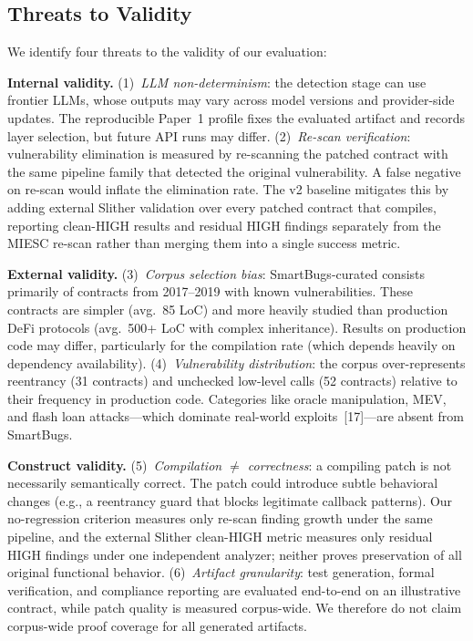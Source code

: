 \documentclass[conference]{IEEEtran}
\begin{document}
\subsection{Threats to Validity}
\label{sec:threats}

We identify four threats to the validity of our evaluation:

\textbf{Internal validity.} (1)~\emph{LLM non-determinism}: the detection stage can use frontier LLMs, whose outputs may vary across model versions and provider-side updates. The reproducible Paper~1 profile fixes the evaluated artifact and records layer selection, but future API runs may differ. (2)~\emph{Re-scan verification}: vulnerability elimination is measured by re-scanning the patched contract with the same pipeline family that detected the original vulnerability. A false negative on re-scan would inflate the elimination rate. The v2 baseline mitigates this by adding external Slither validation over every patched contract that compiles, reporting clean-HIGH results and residual HIGH findings separately from the MIESC re-scan rather than merging them into a single success metric.

\textbf{External validity.} (3)~\emph{Corpus selection bias}: SmartBugs-curated consists primarily of contracts from 2017--2019 with known vulnerabilities. These contracts are simpler (avg.\ 85 LoC) and more heavily studied than production DeFi protocols (avg.\ 500+ LoC with complex inheritance). Results on production code may differ, particularly for the compilation rate (which depends heavily on dependency availability). (4)~\emph{Vulnerability distribution}: the corpus over-represents reentrancy (31 contracts) and unchecked low-level calls (52 contracts) relative to their frequency in production code. Categories like oracle manipulation, MEV, and flash loan attacks---which dominate real-world exploits~[17]---are absent from SmartBugs.

\textbf{Construct validity.} (5)~\emph{Compilation $\neq$ correctness}: a compiling patch is not necessarily semantically correct. The patch could introduce subtle behavioral changes (e.g., a reentrancy guard that blocks legitimate callback patterns). Our no-regression criterion measures only re-scan finding growth under the same pipeline, and the external Slither clean-HIGH metric measures only residual HIGH findings under one independent analyzer; neither proves preservation of all original functional behavior. (6)~\emph{Artifact granularity}: test generation, formal verification, and compliance reporting are evaluated end-to-end on an illustrative contract, while patch quality is measured corpus-wide. We therefore do not claim corpus-wide proof coverage for all generated artifacts.
\end{document}
